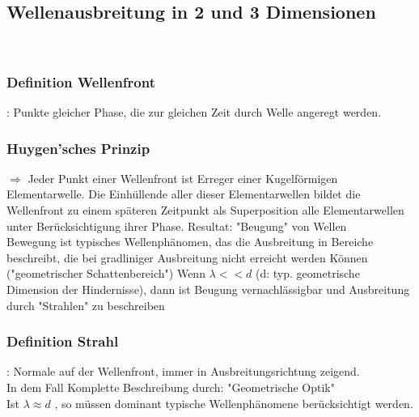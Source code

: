 \subsection{Wellenausbreitung in 2 und 3 Dimensionen} \hfill\\
\subsubsection{Definition Wellenfront}: Punkte gleicher Phase, die zur gleichen Zeit durch Welle angeregt werden. \\
\subsubsection{Huygen'sches Prinzip}\enter
$ \Rightarrow $ Jeder Punkt einer Wellenfront ist Erreger einer Kugelförmigen Elementarwelle. Die Einhüllende aller dieser Elementarwellen bildet die Wellenfront zu einem späteren Zeitpunkt als Superposition alle Elementarwellen unter Berücksichtigung ihrer Phase.
\bild
\bild
Resultat: "Beugung" von Wellen \\
Bewegung ist typisches Wellenphänomen, das die Ausbreitung in Bereiche beschreibt, die bei gradliniger Ausbreitung nicht erreicht werden Können ("geometrischer Schattenbereich")
\bild
Wenn $ \lambda << d $ (d: typ. geometrische Dimension der Hindernisse), dann ist Beugung vernachlässigbar und Ausbreitung durch "Strahlen" zu beschreiben
\subsubsection{Definition Strahl}: Normale auf der Wellenfront, immer in Ausbreitungsrichtung zeigend.\\
In dem Fall Komplette Beschreibung durch: "Geometrische Optik"\\
Ist $ \lambda \approx d$ , so müssen dominant typische Wellenphänomene berücksichtigt werden.\\
